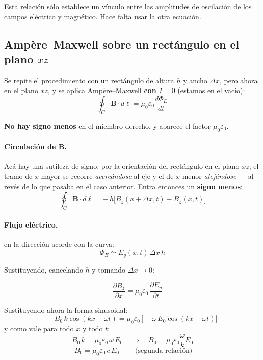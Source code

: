 \documentclass[12pt,a4paper]{article}
\begin{document}
\begin{notebox}
Esta relación sólo establece un vínculo entre las amplitudes de oscilación de
los campos eléctrico y magnético. Hace falta usar la otra ecuación.
\end{notebox}

\subsection{Ampère--Maxwell sobre un rectángulo en el plano $xz$}

Se repite el procedimiento con un rectángulo de altura $h$ y ancho
$\Delta x$, pero ahora en el plano $xz$, y se aplica Ampère--Maxwell
\textbf{con $I = 0$} (estamos en el vacío):
\[
\oint_C \mathbf{B}\cdot d\boldsymbol{\ell}
  = \mu_0\varepsilon_0\frac{d\Phi_E}{dt}
\]

\begin{notebox}
\textbf{No hay signo menos} en el miembro derecho, y aparece el factor
$\mu_0\varepsilon_0$.
\end{notebox}

\paragraph{Circulación de $\mathbf{B}$.}
Acá hay una sutileza de signo: por la orientación del rectángulo en el plano
$xz$, el tramo de $x$ mayor se recorre \emph{acercándose} al eje y el de $x$
menor \emph{alejándose} --- al revés de lo que pasaba en el caso anterior.
Entra entonces un \textbf{signo menos}:
\[
\oint_C \mathbf{B}\cdot d\boldsymbol{\ell}
  = -\,h\big[B_z(x+\Delta x,t) - B_z(x,t)\big]
\]

\paragraph{Flujo eléctrico,} en la dirección acorde con la curva:
\[
\Phi_E \simeq E_y(x,t)\,\Delta x\,h
\]

Sustituyendo, cancelando $h$ y tomando $\Delta x \to 0$:

\begin{keybox}
\[
\boxed{\ -\,\frac{\partial B_z}{\partial x}
       = \mu_0\varepsilon_0\,\frac{\partial E_y}{\partial t}\ }
\]
\end{keybox}

Sustituyendo ahora la forma sinusoidal:
\[
-\,B_0\,k\cos(kx-\omega t)
  = \mu_0\varepsilon_0\,\big[-\omega\,E_0\cos(kx-\omega t)\big]
\]
y como vale para todo $x$ y todo $t$:
\[
B_0\,k = \mu_0\varepsilon_0\,\omega\,E_0
\quad\Longrightarrow\quad
B_0 = \mu_0\varepsilon_0\frac{\omega}{k}E_0
\]
\[
\boxed{\ B_0 = \mu_0\varepsilon_0\,c\,E_0\ } \qquad \text{(segunda relación)}
\]
\end{document}
